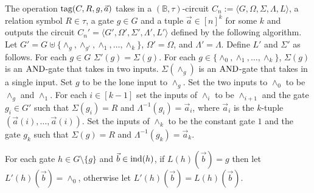 \documentclass[../paper.tex]{subfiles}
\begin{document}
\begin{definition}
  The operation $\text{\upshape tag}(C, R, g, \vec{a})$ takes in a $(\mathbb{B},
  \tau)$-circuit $C_n := \langle G, \Omega, \Sigma, \Lambda, L \rangle$, a
  relation symbol $R \in \tau$, a gate $g \in G$ and a tuple $\vec{a} \in [n]^k$
  for some $k$ and outputs the circuit $C_n' = \langle G', \Omega', \Sigma',
  \Lambda', L'\rangle$ defined by the following algorithm. Let $G' = G \uplus
  \{\land_g, \land_{g'}, \land_1, \ldots , \land_k\}$, $\Omega' = \Omega$, and
  $\Lambda' = \Lambda$. Define $L'$ and $\Sigma'$ as follows. For each $g \in G$
  $\Sigma'(g) = \Sigma(g)$. For each $g \in \{\land_0, \land_1, \ldots , \land_k
  \}$, $\Sigma(g)$ is an $\text{\upshape AND}$-gate that takes in two inputs. $\Sigma(\land_g)$
  is an $\text{\upshape AND}$-gate that takes in a single input. Set $g$ to be the lone input
  to $\land_g$. Set the two inputs to $\land_0$ to be $\land_g$ and $\land_1$.
  For each $i \in [k-1]$ set the inputs of $\land_i$ to be $\land_{i+1}$ and the
  gate $g_i \in G'$ such that $\Sigma(g_i) = R$ and $\Lambda^{-1}(g_i) =
  \vec{a}_i$, where $\vec{a}_i$ is the $k$-tuple $(\vec{a}(i), \ldots,
  \vec{a}(i))$. Set the inputs of $\land_k$ to be the constant gate $1$ and the
  gate $g_k$ such that $\Sigma(g) = R$ and $\Lambda^{-1}(g_k) = \vec{a}_k$.

  For each gate $h \in G \setminus \{g\}$ and $\vec{b} \in \text{\upshape ind}(h)$, if
  $L(h)(\vec{b}) = g$ then let $L'(h)(\vec{b}) = \land_0$, otherwise let
  $L'(h)(\vec{b}) = L(h)(\vec{b})$.

\end{definition}

\end{document}
